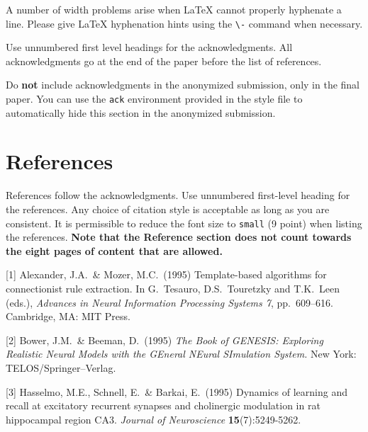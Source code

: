 \documentclass{article}
\begin{document}
A number of width problems arise when \LaTeX{} cannot properly hyphenate a
line. Please give LaTeX hyphenation hints using the \verb+\-+ command when
necessary.


\begin{ack}
Use unnumbered first level headings for the acknowledgments. All acknowledgments
go at the end of the paper before the list of references.

Do {\bf not} include acknowledgments in the anonymized submission, only in the final paper. You can use the \texttt{ack} environment provided in the style file to automatically hide this section in the anonymized submission.
\end{ack}

\section*{References}

References follow the acknowledgments. Use unnumbered first-level heading for
the references. Any choice of citation style is acceptable as long as you are
consistent. It is permissible to reduce the font size to \verb+small+ (9 point)
when listing the references.
{\bf Note that the Reference section does not count towards the eight pages of content that are allowed.}
\medskip

\small

[1] Alexander, J.A.\ \& Mozer, M.C.\ (1995) Template-based algorithms for
connectionist rule extraction. In G.\ Tesauro, D.S.\ Touretzky and T.K.\ Leen
(eds.), {\it Advances in Neural Information Processing Systems 7},
pp.\ 609--616. Cambridge, MA: MIT Press.

[2] Bower, J.M.\ \& Beeman, D.\ (1995) {\it The Book of GENESIS: Exploring
  Realistic Neural Models with the GEneral NEural SImulation System.}  New York:
TELOS/Springer--Verlag.

[3] Hasselmo, M.E., Schnell, E.\ \& Barkai, E.\ (1995) Dynamics of learning and
recall at excitatory recurrent synapses and cholinergic modulation in rat
hippocampal region CA3. {\it Journal of Neuroscience} {\bf 15}(7):5249-5262.
\end{document}
